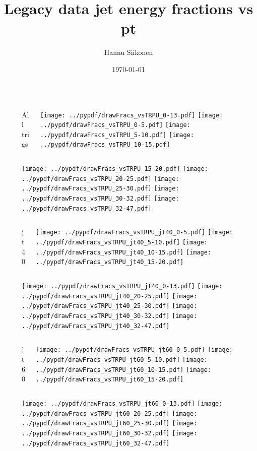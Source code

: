 \documentclass[aspectratio=169]{beamer}
\title[Legacy data jet energy fractions vs pt]{Legacy data jet energy fractions vs pt}
\author{Hannu Siikonen}
\institute{Helsinki Institute of Physics \\ \vspace{0.25cm} Instructor Adj.~Prof.~Mikko~Voutilainen}
\date{\today}
\begin{document}
\titlepage

\newpage

\begin{figure}[p]
\flushleft
\begin{columns}[T]
\begin{column}{.2\linewidth}
\centering
All trigs
\end{column}
\begin{column}{.8\linewidth}
\texttt{[image: ../pypdf/drawFracs\_vsTRPU\_0-13.pdf]}
\texttt{[image: ../pypdf/drawFracs\_vsTRPU\_0-5.pdf]}
\texttt{[image: ../pypdf/drawFracs\_vsTRPU\_5-10.pdf]}
\texttt{[image: ../pypdf/drawFracs\_vsTRPU\_10-15.pdf]}
\end{column}
\end{columns}
\texttt{[image: ../pypdf/drawFracs\_vsTRPU\_15-20.pdf]}
\texttt{[image: ../pypdf/drawFracs\_vsTRPU\_20-25.pdf]}
\texttt{[image: ../pypdf/drawFracs\_vsTRPU\_25-30.pdf]}
\texttt{[image: ../pypdf/drawFracs\_vsTRPU\_30-32.pdf]}
\texttt{[image: ../pypdf/drawFracs\_vsTRPU\_32-47.pdf]}
\end{figure}

\begin{figure}[p]
\flushleft
\begin{columns}[T]
\begin{column}{.2\linewidth}
\centering
jt40
\end{column}
\begin{column}{.8\linewidth}
\texttt{[image: ../pypdf/drawFracs\_vsTRPU\_jt40\_0-5.pdf]}
\texttt{[image: ../pypdf/drawFracs\_vsTRPU\_jt40\_5-10.pdf]}
\texttt{[image: ../pypdf/drawFracs\_vsTRPU\_jt40\_10-15.pdf]}
\texttt{[image: ../pypdf/drawFracs\_vsTRPU\_jt40\_15-20.pdf]}
\end{column}
\end{columns}
\texttt{[image: ../pypdf/drawFracs\_vsTRPU\_jt40\_0-13.pdf]}
\texttt{[image: ../pypdf/drawFracs\_vsTRPU\_jt40\_20-25.pdf]}
\texttt{[image: ../pypdf/drawFracs\_vsTRPU\_jt40\_25-30.pdf]}
\texttt{[image: ../pypdf/drawFracs\_vsTRPU\_jt40\_30-32.pdf]}
\texttt{[image: ../pypdf/drawFracs\_vsTRPU\_jt40\_32-47.pdf]}
\end{figure}

\begin{figure}[p]
\flushleft
\begin{columns}[T]
\begin{column}{.2\linewidth}
\centering
jt60
\end{column}
\begin{column}{.8\linewidth}
\texttt{[image: ../pypdf/drawFracs\_vsTRPU\_jt60\_0-5.pdf]}
\texttt{[image: ../pypdf/drawFracs\_vsTRPU\_jt60\_5-10.pdf]}
\texttt{[image: ../pypdf/drawFracs\_vsTRPU\_jt60\_10-15.pdf]}
\texttt{[image: ../pypdf/drawFracs\_vsTRPU\_jt60\_15-20.pdf]}
\end{column}
\end{columns}
\texttt{[image: ../pypdf/drawFracs\_vsTRPU\_jt60\_0-13.pdf]}
\texttt{[image: ../pypdf/drawFracs\_vsTRPU\_jt60\_20-25.pdf]}
\texttt{[image: ../pypdf/drawFracs\_vsTRPU\_jt60\_25-30.pdf]}
\texttt{[image: ../pypdf/drawFracs\_vsTRPU\_jt60\_30-32.pdf]}
\texttt{[image: ../pypdf/drawFracs\_vsTRPU\_jt60\_32-47.pdf]}
\end{figure}
\end{document}
